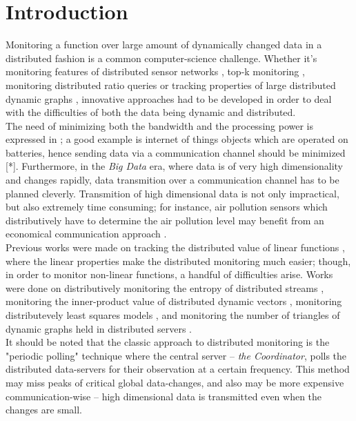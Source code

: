\documentclass[10pt, conference]{IEEEtran}
\newcommand{\theCoordinator}{\textit{the Coordinator}}
\begin{document}
\section{Introduction}
Monitoring a function over large amount of dynamically changed data in a distributed fashion is a common computer-science challenge. Whether it's monitoring features of distributed sensor networks \cite{burdakis2012detecting}, top-k monitoring \cite{babcock2003distributed}, monitoring distributed ratio queries \cite{gupta2013ratio} or tracking properties of large distributed dynamic graphs \cite{mcgregor2015densest}, innovative approaches had to be developed in order to deal with the difficulties of both the data being dynamic and distributed. \\
The need of minimizing both the bandwidth and the processing power is expressed in \cite{giatrakos2013network}; a good example is internet of things objects which are operated on batteries, hence sending data via a communication channel should be minimized [*]. Furthermore, in the \textit{Big Data} era, where data is of very high dimensionality and changes rapidly, data transmition over a communication channel has to be planned cleverly. Transmition of high dimensional data is not only impractical, but also extremely time consuming; for instance, air pollution sensors which distributively have to determine the air pollution level may benefit from an economical communication approach \cite{cheng2004revised}. \\
Previous works were made on tracking the distributed value of linear functions \cite{keralapura2006communication}, where the linear properties make the distributed monitoring much easier; though, in order to monitor non-linear functions, a handful of difficulties arise. Works were done on distributively monitoring the entropy of distributed streams \cite{gabel2017anarchists}\cite{cormode2013continuous}, monitoring the inner-product value of distributed dynamic vectors \cite{garofalakis2013sketch}, monitoring distributevely least squares models \cite{gabel2015monitoring}, and monitoring the number of triangles of dynamic graphs held in distributed servers \cite{yehuda2017monitoring}. \\
It should be noted that the classic approach to distributed monitoring is the "periodic polling" technique \cite{cormode2013continuous} where the central server -- \theCoordinator , polls the distributed data-servers for their observation at a certain frequency. This method may miss peaks of critical global data-changes, and also may be more expensive communication-wise -- high dimensional data is transmitted even when the changes are small. \\
\end{document}

